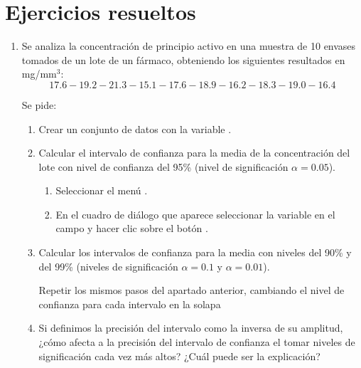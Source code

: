 \section{Ejercicios resueltos}
\begin{enumerate}[leftmargin=*]
\item  Se analiza la concentración de principio activo en una muestra de 10 envases tomados de un lote de un fármaco,
obteniendo los siguientes resultados en mg/mm$^{3}$:
\[
17.6-19.2-21.3-15.1-17.6-18.9-16.2-18.3-19.0-16.4
\]

Se pide:
\begin{enumerate}
\item  Crear un conjunto de datos con la variable .
\item  Calcular el intervalo de confianza para la media de la concentración del lote con nivel de confianza del 95\%
(nivel de significación $\alpha =0.05$).
\begin{indicacion}{
\begin{enumerate}
\item Seleccionar el menú .
\item En el cuadro de diálogo que aparece seleccionar la variable  en el campo 
y hacer clic sobre el botón .
\end{enumerate}
}
\end{indicacion}

\item Calcular los intervalos de confianza para la media con niveles del 90\% y del 99\% (niveles de significación
$\alpha=0.1$ y $\alpha=0.01$).
\begin{indicacion}{
Repetir los mismos pasos del apartado anterior, cambiando el nivel de confianza para cada intervalo en la solapa 
}
\end{indicacion}

\item  Si definimos la precisión del intervalo como la inversa de su amplitud, ¿cómo afecta a la precisión del intervalo de confianza el
tomar niveles de significación cada vez más altos? ¿Cuál puede ser la explicación?


\end{enumerate}
\end{enumerate}
